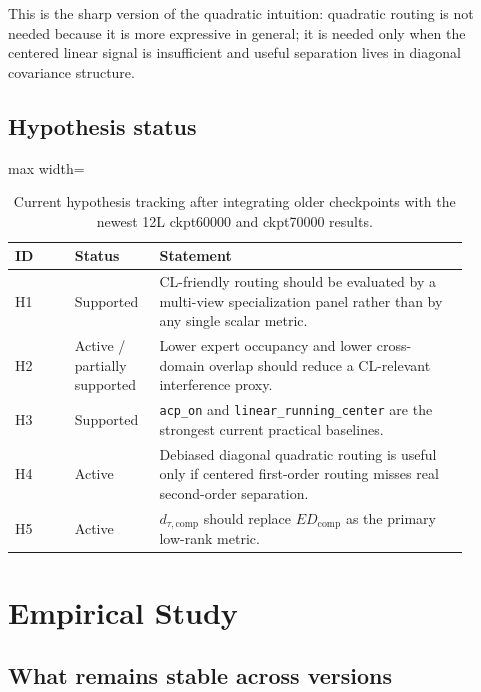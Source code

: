 \documentclass[11pt]{article}
\newcommand{\tablesize}{\footnotesize}
\begin{document}
This is the sharp version of the quadratic intuition: quadratic routing is not needed because it is more expressive in general; it is needed only when the centered linear signal is insufficient and useful separation lives in diagonal covariance structure.

\subsection{Hypothesis status}

\begin{table}[H]
\centering
\tablesize
\begin{adjustbox}{max width=\linewidth}
\begin{tabular}{p{0.12\linewidth}p{0.16\linewidth}p{0.62\linewidth}}
\toprule
ID & Status & Statement \\
\midrule
H1 & Supported & CL-friendly routing should be evaluated by a multi-view specialization panel rather than by any single scalar metric. \\
H2 & Active / partially supported & Lower expert occupancy and lower cross-domain overlap should reduce a CL-relevant interference proxy. \\
H3 & Supported & \texttt{acp\_on} and \texttt{linear\_running\_center} are the strongest current practical baselines. \\
H4 & Active & Debiased diagonal quadratic routing is useful only if centered first-order routing misses real second-order separation. \\
H5 & Active & $d_{\tau,\mathrm{comp}}$ should replace $ED_{\mathrm{comp}}$ as the primary low-rank metric. \\
\bottomrule
\end{tabular}
\end{adjustbox}
\caption{Current hypothesis tracking after integrating older checkpoints with the newest 12L ckpt60000 and ckpt70000 results.}
\label{tab:hypothesis-status}
\end{table}

\section{Empirical Study}

\subsection{What remains stable across versions}
\end{document}
